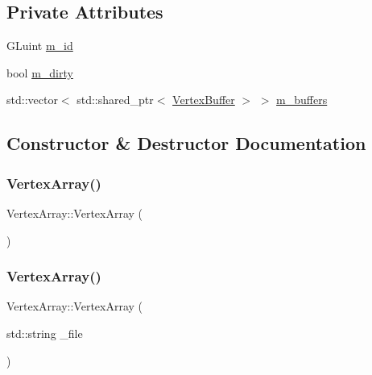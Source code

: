 \subsection*{Private Attributes}
\begin{DoxyCompactItemize}
\item 
G\+Luint \mbox{\hyperlink{class_disc___engine_1_1_vertex_array_ad5361d354e5ba5cf29a056bb2a9be3a3}{m\+\_\+id}}
\item 
bool \mbox{\hyperlink{class_disc___engine_1_1_vertex_array_a718eddeec57b85c72b07bc350cb38caa}{m\+\_\+dirty}}
\item 
std\+::vector$<$ std\+::shared\+\_\+ptr$<$ \mbox{\hyperlink{class_disc___engine_1_1_vertex_buffer}{Vertex\+Buffer}} $>$ $>$ \mbox{\hyperlink{class_disc___engine_1_1_vertex_array_aab519e61825a817c4d78a5db8413220e}{m\+\_\+buffers}}
\end{DoxyCompactItemize}


\subsection{Constructor \& Destructor Documentation}
\mbox{\label{class_disc___engine_1_1_vertex_array_ab8a2dcce9698f96dac5f9a19c6979d03}} 
\subsubsection{\texorpdfstring{Vertex\+Array()}{VertexArray()}\hspace{0.1cm}{\footnotesize\ttfamily [1/2]}}
{\footnotesize\ttfamily Vertex\+Array\+::\+Vertex\+Array (\begin{DoxyParamCaption}{ }\end{DoxyParamCaption})}

\mbox{\label{class_disc___engine_1_1_vertex_array_a5a2ba48c12787ad986bdf8dbb1a8675a}} 
\subsubsection{\texorpdfstring{Vertex\+Array()}{VertexArray()}\hspace{0.1cm}{\footnotesize\ttfamily [2/2]}}
{\footnotesize\ttfamily Vertex\+Array\+::\+Vertex\+Array (\begin{DoxyParamCaption}\item[{std\+::string}]{\+\_\+file }\end{DoxyParamCaption})}

